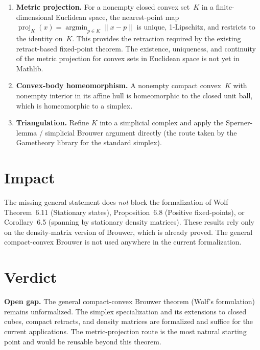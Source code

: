 \documentclass{article}
\begin{document}
\begin{enumerate}
  \item \textbf{Metric projection.}  For a nonempty closed convex set~\(K\) in a
    finite-dimensional Euclidean space, the nearest-point map
    \(\operatorname{proj}_K(x) = \operatorname*{argmin}_{p \in K} \lVert x-p\rVert\) is unique,
    1-Lipschitz, and restricts to the identity on~\(K\).  This provides the
    retraction required by the existing retract-based fixed-point theorem.  The
    existence, uniqueness, and continuity of the metric projection for convex
    sets in Euclidean space is not yet in Mathlib.

  \item \textbf{Convex-body homeomorphism.}  A nonempty compact convex~\(K\)
    with nonempty interior in its affine hull is homeomorphic to the closed
    unit ball, which is homeomorphic to a simplex.

  \item \textbf{Triangulation.}  Refine \(K\) into a simplicial complex and
    apply the Sperner-lemma / simplicial Brouwer argument directly (the route
    taken by the Gametheory library for the standard simplex).
\end{enumerate}

\section{Impact}

The missing general statement does \emph{not} block the formalization of Wolf
Theorem~6.11 (Stationary states), Proposition~6.8 (Positive fixed-points), or
Corollary~6.5 (spanning by stationary density matrices).  These results rely
only on the density-matrix version of Brouwer, which is already proved.
The general compact-convex Brouwer is not used anywhere in the current
formalization.

\section{Verdict}

\textbf{Open gap.}  The general compact-convex Brouwer theorem (Wolf's
formulation) remains unformalized.  The simplex specialization and its
extensions to closed cubes, compact retracts, and density matrices are formalized
and suffice for the current applications.  The metric-projection route is the
most natural starting point and would be reusable beyond this theorem.



\end{document}
